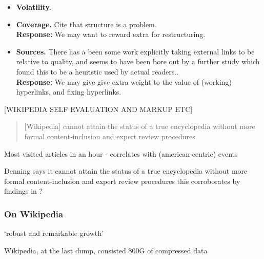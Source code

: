 \documentclass[a4paper,11pt,twoside,notitlepage]{article}
\begin{document}
\begin{itemize}
            malformed and misinformed editing, but we may also take it
            to mean malicious editing. As for malicious edits - we
            find a lot of useful information in Potthast et al's work
            on automatic detection of vandals,\cite{Potthast2008} as
            well as the discussions around Wikipedia's own
            Counter-Vandalism Unit (`CVU').\cite{wiki-vandalism}
            including 
          \item \textbf{Volatility.} 
          \item \textbf{Coverage.} Cite that structure is a
            problem.\\
            \textbf{Response:} We may want to reward extra for restructuring.
          \item \textbf{Sources.} There has a been some work
            explicitly taking external links to be relative to
            quality,\cite{CITEHYPERLINKS} and seems to have been bore
            out by a further study which found this to be a heuristic
            used by actual readers.\cite{THISHEURISTICIGUESS}.\\
            \textbf{Response:} We may give give extra weight to the value
            of (working) hyperlinks, and fixing hyperlinks.
        \end{itemize}
            
        [WIKIPEDIA SELF EVALUATION AND MARKUP ETC]
        \begin{quote}
          [Wikipedia] cannot attain the status of a true encyclopedia
          without more formal content-inclusion and expert review
          procedures.\cite{Denning2005}
        \end{quote}

        Most visited articles in an hour - correlates with
        (american-centric) events \cite{wiki-visits}

        Denning says it cannot attain the status of a true
        encyclopedia without more formal content-inclusion and expert
        review procedures\cite{Denning2005} this corroborates by
        findings in \cite{Giles2005}?

        \subsubsection{On Wikipedia}
        `robust and remarkable growth'
        \cite{Kittur2007}\cite{Voss2005} 
        
        Wikipedia, at the last dump, consisted 800G of compressed data
        \cite{wiki-dump}
\end{document}
